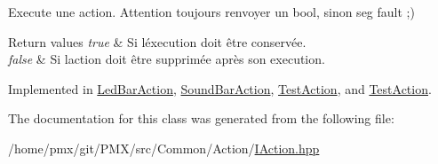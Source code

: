 Execute une action. Attention toujours renvoyer un bool, sinon seg fault ;) 


\begin{DoxyRetVals}{Return values}
{\em true} & Si l\textquotesingle{}éxecution doit être conservée. \\
\hline
{\em false} & Si l\textquotesingle{}action doit être supprimée après son execution. \\
\hline
\end{DoxyRetVals}


Implemented in \hyperlink{classLedBarAction_a67bc2c636064156c80319623b88ec5e8}{Led\+Bar\+Action}, \hyperlink{classSoundBarAction_ad080a35d375a14b912ed5d2625c0b687}{Sound\+Bar\+Action}, \hyperlink{classTestAction_a80c76775fe017bd75bc3c23abcbafb43}{Test\+Action}, and \hyperlink{classTestAction_abc2406605ef5655ea05fb3eaf2a74051}{Test\+Action}.



The documentation for this class was generated from the following file\+:\begin{DoxyCompactItemize}
\item 
/home/pmx/git/\+P\+M\+X/src/\+Common/\+Action/\hyperlink{IAction_8hpp}{I\+Action.\+hpp}\end{DoxyCompactItemize}
